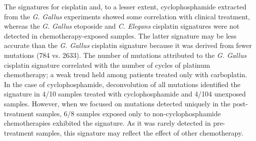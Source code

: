 \documentclass[linenumbers]{bmcart}
\begin{document}
The signatures for cisplatin and, to a lesser extent, cyclophosphamide extracted from the \textit{G. Gallus} experiments showed some correlation with clinical treatment, whereas the \textit{G. Gallus} etoposide and \textit{C. Elegans} cisplatin signatures were not detected in chemotherapy-exposed samples. The latter signature may be less accurate than the \textit{G. Gallus} cisplatin signature because it was derived from fewer mutations (784 vs. 2633).  The number of mutations attributed to the \textit{G. Gallus} cisplatin signature correlated with the number of cycles of platinum chemotherapy; a weak trend held among patients treated only with carboplatin. In the case of cyclophosphamide, deconvolution of all mutations identified the signature in 4/10 samples treated with cyclophosphamide and 4/104 unexposed samples. However, when we focused on mutations detected uniquely in the post-treatment samples, 6/8 samples exposed only to non-cyclophosphamide chemotherapies exhibited the signature. As it was rarely detected in pre-treatment samples, this signature may reflect the effect of other chemotherapy.







\end{document}
